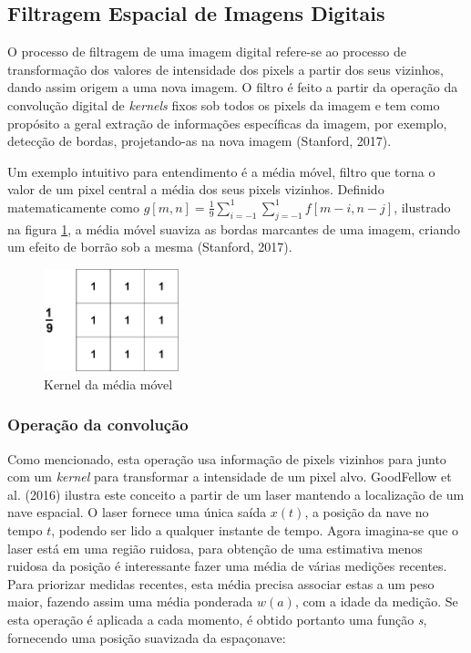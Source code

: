 \documentclass[12pt]{report}
\begin{document}
\subsection{Filtragem Espacial de Imagens Digitais}

O processo de filtragem de uma imagem digital refere-se ao processo de transformação dos valores de intensidade dos pixels a partir dos seus vizinhos, dando assim origem a uma nova imagem. O filtro é feito a partir da operação da convolução digital de \textit{kernels} fixos sob todos os pixels da imagem e tem como propósito a geral extração de informações específicas da imagem, por exemplo, detecção de bordas, projetando-as na nova imagem (Stanford, 2017).

Um exemplo intuitivo para entendimento é a média móvel, filtro que torna o valor de um pixel central a média dos seus pixels vizinhos. Definido matematicamente como $g[m,n] = \frac{1}{9} \sum_{i= -1}^{1} \sum_{j= -1}^{1} f[m - i,n - j]$, ilustrado na figura \ref{fig:blur}, a média móvel suaviza as bordas marcantes de uma imagem, criando um efeito de borrão sob a mesma (Stanford, 2017).  

\begin{figure}
    \centering
    \includegraphics[width=0.35\textwidth]{images/blur.png}
    \caption{Kernel da média móvel}
    \source{} 
    \label{fig:blur}
\end{figure}

\subsubsection{Operação da convolução}

Como mencionado, esta operação usa informação de pixels vizinhos para junto com um \textit{kernel} para transformar a intensidade de um pixel alvo. GoodFellow et al. (2016) ilustra este conceito a partir de um laser mantendo a localização de um nave espacial. O laser fornece uma única saída $x(t)$, a posição da nave no tempo $t$, podendo ser lido a qualquer instante de tempo. Agora imagina-se que o laser está em uma região ruidosa, para obtenção de uma estimativa menos ruidosa da posição é interessante fazer uma média de várias medições recentes. Para priorizar medidas recentes, esta média precisa associar estas a um peso maior, fazendo assim uma média ponderada $w(a)$, com a idade da medição. Se esta operação é aplicada a cada momento, é obtido portanto uma função \textit{s}, fornecendo uma posição suavizada da espaçonave:
\end{document}
